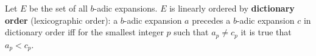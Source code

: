 Let $E$ be the set of all $b$-adic expansions. $E$ is linearly ordered by \textbf{dictionary order} (lexicographic order): a $b$-adic expansion $a$ precedes a $b$-adic expansion $c$ in dictionary order iff for the smallest integer $p$ such that $a_p \neq c_p$ it is true that $a_p < c_p$.
